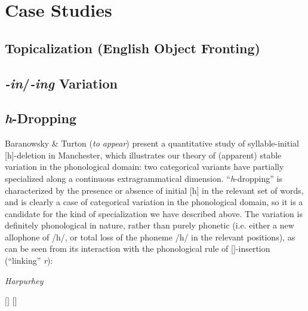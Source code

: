 \section{Case Studies}
\label{cases}

\subsection{Topicalization (English Object Fronting)}
\label{topsect}


\subsection{\textsl{-in}/\textsl{-ing} Variation}

\subsection{\textsl{h}-Dropping}

Baranowsky \& Turton (\textsl{to appear})  present a quantitative study of syllable-initial [h]-deletion in Manchester, which illustrates our theory of (apparent) stable variation in the phonological domain: two categorical variants have partially specialized along a continuous extragrammatical dimension.
``\textsl{h}-dropping'' is characterized by the presence or absence of initial [h] in the relevant set of words, and is clearly a case of categorical variation in the phonological domain, so it is a candidate for the kind of specialization we have described above.
The variation is definitely phonological in nature, rather than purely phonetic (i.e. either a new allophone of /h/, or total loss of the phoneme /h/ in the relevant positions), as can be seen from its interaction with the phonological rule of []-insertion (``linking'' \textsl{r}):




	\begin{exe}
		\ex \quad \textsl{Harpurhey}
		\begin{xlist}
			\ex \label{har1} $[$$]$
			\ex \label{har2} $[$$]$
		\end{xlist}
	\end{exe}

